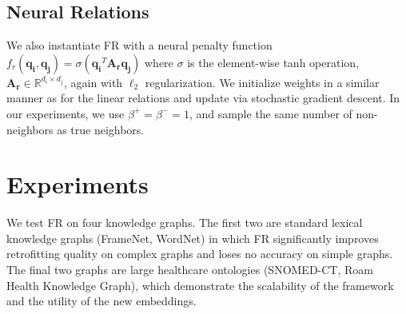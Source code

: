 \documentclass[11pt, a4paper]{article}
\newcommand\numberthis{\addtocounter{equation}{1}\tag{\theequation}}
\begin{document}
\subsection{Neural Relations}
We also instantiate FR with a neural penalty function $f_r(\boldsymbol{q_i}, \boldsymbol{q_j}) = \sigma(\boldsymbol{q_i}^T\boldsymbol{A_r}\boldsymbol{q_j})$ 
where $\sigma$ is the element-wise tanh operation, $\boldsymbol{A_r} \in \mathbb{R}^{d_i \times d_j}$, again with $\ell_2$ regularization.%
We initialize weights in a similar manner as for the linear relations and update via stochastic gradient descent. In our experiments, we use $\beta^+=\beta^-=1$, and sample the same number of non-neighbors as true neighbors.


\section{Experiments}
\label{sec:experiments}
We test FR on four knowledge graphs. The first two are standard lexical knowledge graphs (FrameNet, WordNet) in which FR significantly improves retrofitting quality on complex graphs and loses no accuracy on simple graphs. The final two graphs are large healthcare ontologies (SNOMED-CT, Roam Health Knowledge Graph), which demonstrate the scalability of the framework and the utility of the new embeddings.
\end{document}
